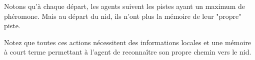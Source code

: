 \documentclass{rapportECL}
\begin{document}
Notons qu’à chaque départ, les agents suivent les pistes ayant un maximum de phéromone. Mais au départ du nid, ils n’ont plus la mémoire de leur "propre" piste.

Notez que toutes ces actions nécessitent des informations locales et une mémoire à court terme permettant à l’agent de reconnaître son propre chemin vers le nid.











\end{document}
